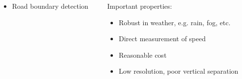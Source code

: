 {\begin{frame}
\begin{columns}[T]
\begin{column}{.6\textwidth}
\begin{columns}[T]
\begin{column}{0.4\textwidth}
\begin{itemize}
                    \item Road boundary detection
                \end{itemize}
            \end{column}
            \begin{column}{0.6\textwidth}
                \footnotesize
                Important properties:
                \begin{itemize}
                    \item Robust in weather, e.g. rain, fog, etc.
                    \item Direct measurement of speed
                    \item Reasonable cost
                    \item Low resolution, poor vertical separation
                \end{itemize}
            \end{column}
        \end{columns}
    \end{column}
\end{columns}
\end{frame}

}
